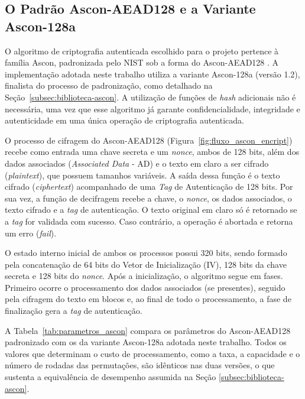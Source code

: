 
\subsection{O Padrão Ascon-AEAD128 e a Variante Ascon-128a}
O algoritmo de criptografia autenticada escolhido para o projeto pertence à família Ascon, padronizada pelo NIST sob a forma do Ascon-AEAD128 \cite{nist2025ascon}. A implementação adotada neste trabalho utiliza a variante Ascon-128a (versão 1.2), finalista do processo de padronização, como detalhado na Seção~\ref{subsec:biblioteca-ascon}. A utilização de funções de \textit{hash} adicionais não é necessária, uma vez que esse algoritmo já garante confidencialidade, integridade e autenticidade em uma única operação de criptografia autenticada.

O processo de cifragem do Ascon-AEAD128 (Figura~\ref{fig:fluxo_ascon_encript}) recebe como entrada uma chave secreta e um \textit{nonce}, ambos de 128 bits, além dos dados associados (\textit{Associated Data} - AD) e o texto em claro a ser cifrado (\textit{plaintext}), que possuem tamanhos variáveis. A saída dessa função é o texto cifrado (\textit{ciphertext}) acompanhado de uma \textit{Tag} de Autenticação de 128 bits. Por sua vez, a função de decifragem recebe a chave, o \textit{nonce}, os dados associados, o texto cifrado e a \textit{tag} de autenticação. O texto original em claro só é retornado se a \textit{tag} for validada com sucesso. Caso contrário, a operação é abortada e retorna um erro (\textit{fail}).

O estado interno inicial de ambos os processos possui 320 bits, sendo formado pela concatenação de 64 bits do Vetor de Inicialização (IV), 128 bits da chave secreta e 128 bits do \textit{nonce}. Após a inicialização, o algoritmo segue em fases. Primeiro ocorre o processamento dos dados associados (se presentes), seguido pela cifragem do texto em blocos e, ao final de todo o processamento, a fase de finalização gera a \textit{tag} de autenticação.

A Tabela~\ref{tab:parametros_ascon} compara os parâmetros do Ascon-AEAD128 padronizado com os da variante Ascon-128a adotada neste trabalho. Todos os valores que determinam o custo de processamento, como a taxa, a capacidade e o número de rodadas das permutações, são idênticos nas duas versões, o que sustenta a equivalência de desempenho assumida na Seção \ref{subsec:biblioteca-ascon}.

